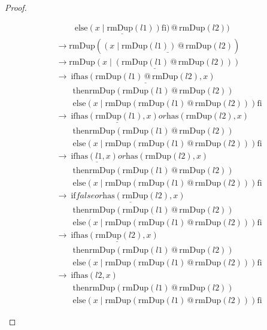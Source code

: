 \documentclass[12pt, a4paper]{article}
\newcommand{\rel}[1]{\mathrel{#1}}
\newcommand{\rmx}[1]{\mathrm{#1}}
\newcommand{\larrow}{\longrightarrow}
\newcommand{\under}{\underline}
\begin{document}
\begin{proof}
\begin{description}
\begin{align*}
	&\quad \quad\ \under{\rel{\rmx{else}} (x \mid \rmx{rmDup}(l1)) \rel{\rmx{fi}})} \rel{@} \rmx{rmDup}(l2)) \tag{by case splitting} \\
	&\larrow \rmx{rmDup}(\under{(x \mid \rmx{rmDup}(l1)) \rel{@} \rmx{rmDup}(l2)}) \tag{by if2} \\
	&\larrow \under{\rmx{rmDup}(x \mid (\rmx{rmDup}(l1) \rel{@} \rmx{rmDup}(l2)))} \tag{by @2} \\
	&\larrow\ \rel{\rmx{if}} \under{\rmx{has}(\rmx{rmDup}(l1) \rel{@} \rmx{rmDup}(l2), x)}  \\
	&\quad \quad \rel{\rmx{then}} \rmx{rmDup}(\rmx{rmDup}(l1) \rel{@} \rmx{rmDup}(l2)) \\
	&\quad \quad \rel{\rmx{else}} (x \mid \rmx{rmDup}(\rmx{rmDup}(l1) \rel{@} \rmx{rmDup}(l2))) \rel{\rmx{fi}} \tag{by rmDup2} \\
	&\larrow\ \rel{\rmx{if}} \under{\rmx{has}(\rmx{rmDup}(l1), x)} \rel{or} \rmx{has}(\rmx{rmDup}(l2), x)  \\
	&\quad \quad \rel{\rmx{then}} \rmx{rmDup}(\rmx{rmDup}(l1) \rel{@} \rmx{rmDup}(l2)) \\
	&\quad \quad \rel{\rmx{else}} (x \mid \rmx{rmDup}(\rmx{rmDup}(l1) \rel{@} \rmx{rmDup}(l2))) \rel{\rmx{fi}} \tag{by Problem 6 - Lemma 1} \\
	&\larrow\ \rel{\rmx{if}} \under{\rmx{has}(l1, x)} \rel{or} \rmx{has}(\rmx{rmDup}(l2), x)  \\
	&\quad \quad \rel{\rmx{then}} \rmx{rmDup}(\rmx{rmDup}(l1) \rel{@} \rmx{rmDup}(l2)) \\
	&\quad \quad \rel{\rmx{else}} (x \mid \rmx{rmDup}(\rmx{rmDup}(l1) \rel{@} \rmx{rmDup}(l2))) \rel{\rmx{fi}} \tag{by Problem 17 - Lemma 1} \\
	&\larrow\ \rel{\rmx{if}} \under{false \rel{or} \rmx{has}(\rmx{rmDup}(l2), x)}  \\
	&\quad \quad \rel{\rmx{then}} \rmx{rmDup}(\rmx{rmDup}(l1) \rel{@} \rmx{rmDup}(l2)) \\
	&\quad \quad \rel{\rmx{else}} (x \mid \rmx{rmDup}(\rmx{rmDup}(l1) \rel{@} \rmx{rmDup}(l2))) \rel{\rmx{fi}} \tag{by case splitting} \\
	&\larrow\ \rel{\rmx{if}} \under{\rmx{has}(\rmx{rmDup}(l2), x)}  \\
	&\quad \quad \rel{\rmx{then}} \rmx{rmDup}(\rmx{rmDup}(l1) \rel{@} \rmx{rmDup}(l2)) \\
	&\quad \quad \rel{\rmx{else}} (x \mid \rmx{rmDup}(\rmx{rmDup}(l1) \rel{@} \rmx{rmDup}(l2))) \rel{\rmx{fi}} \tag{by or} \\
	&\larrow\ \rel{\rmx{if}} \rmx{has}(l2, x)  \\
	&\quad \quad \rel{\rmx{then}} \rmx{rmDup}(\rmx{rmDup}(l1) \rel{@} \rmx{rmDup}(l2)) \\
	&\quad \quad \rel{\rmx{else}} (x \mid \rmx{rmDup}(\rmx{rmDup}(l1) \rel{@} \rmx{rmDup}(l2))) \rel{\rmx{fi}} \tag{by Problem 17 - Lemma 1}
\end{align*}
\end{description}
\end{proof}
\end{document}
